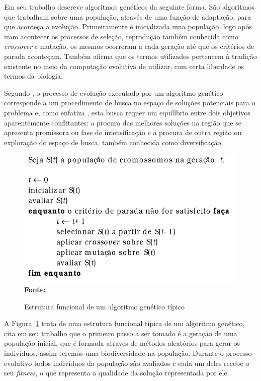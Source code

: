 Em seu trabalho \cite{lucas2000algoritmos} descreve algoritmos genéticos da seguinte forma. São algoritmos que trabalham sobre uma população, através de uma função de adaptação, para que aconteça a evolução. Primeiramente é inicializada uma população, logo após iram acontecer os processos de seleção, reprodução também conhecida como \textit{crossover} e mutação, os mesmos ocorreram a cada geração até que os critérios de parada aconteçam. Também afirma que os termos utilizados pertencem à tradição existente no meio da computação evolutiva de utilizar, com certa liberdade os termos da biologia.

Segundo \cite{oliveira2005algoritmo}, o processo de evolução executado por um algoritmo genético corresponde a um procedimento de busca no espaço de soluções potenciais para o problema e, como enfatiza \cite{michalewicz1996evolutionary}, esta busca requer um equilíbrio entre dois objetivos aparentemente conflitantes: a procura das melhores soluções na região que se apresenta promissora ou fase de intensificação e a procura de outra região ou exploração do espaço de busca, também conhecida como diversificação.\par

\begin{figure}[!htb]
\caption[Estrutura funcional de um algoritmo genético típico]{Estrutura funcional de um algoritmo genético típico}
\label{fig:ag}
\centering
\includegraphics[scale=0.7]{imagens/ag.png}
\\ \textbf{\footnotesize Fonte: \cite{de1999introduccao}}
\end{figure}


A Figura~\ref{fig:ag} trata de uma estrutura funcional típica de um algoritmo genético, \cite{de1999introduccao} cita em seu trabalho que o primeiro passo a ser tomado é a geração de uma população inicial, que é formada através de métodos aleatórios para gerar os indivíduos, assim teremos uma biodiversidade na população. Durante o processo evolutivo todos indivíduos da população são avaliados e cada um deles recebe o seu \textit{fitness}, o que representa a qualidade da solução representada por ele.\par

